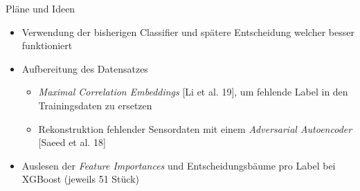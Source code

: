 \documentclass[10pt,%
	wide,%
	xcolor={x11names},%
	hyperref={colorlinks},%
	pantone312,%
	handout,%
	]{beamer}
\begin{document}
\begin{frame}[t]{Pläne und Ideen}
	\begin{itemize}
		\item Verwendung der bisherigen Classifier und spätere Entscheidung welcher besser funktioniert
		\item Aufbereitung des Datensatzes
		\begin{itemize}
			\item \emph{Maximal Correlation Embeddings} [Li et al. 19], um fehlende Label in den Trainingsdaten zu ersetzen
			\item Rekonstruktion fehlender Sensordaten mit einem \emph{Adversarial Autoencoder} [Saeed et al. 18]
		\end{itemize}
		\item Auslesen der \emph{Feature Importances} und Entscheidungsbäume pro Label bei XGBoost (jeweils 51 Stück)
	\end{itemize}
\end{frame}
\end{document}
